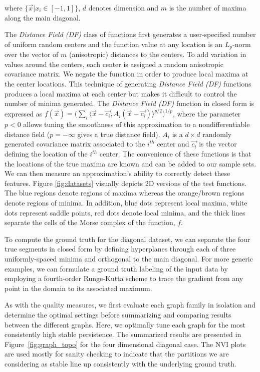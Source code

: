 where $\{\vec{x}|x_i\in [-1,1]\}$, $d$ denotes dimension and $m$ is the number of maxima along the main diagonal.

The \emph{Distance Field (DF)} class of functions first generates a user-specified number of uniform random centers and the function value at any location is an $L_p$-norm over the vector of $m$ (anisotropic) distances to the centers.
%
To add variation in values around the centers, each center is assigned a random anisotropic covariance matrix.
%
We negate the function in order to produce local maxima at the center locations.
%
This technique of generating \emph{Distance Field (DF)} functions produces a local maxima at each center but makes it difficult to control the number of minima generated.
%
The \emph{Distance Field (DF)} function in closed form is expressed as $f(\vec{x}) = \bigl(\sum_i \langle\vec{x}-\vec{c_i},A_i(\vec{x}-\vec{c_i})\rangle^{p/2}\bigr)^{1/p}$, where the parameter $p < 0$ allows tuning the smoothness of this approximation to a nondifferentiable distance field ($p = -\infty$ gives a true distance field).
%
$A_i$ is a $d \times d$ randomly generated covariance matrix associated to the $i^{th}$ center and $\vec{c_i}$ is the vector defining the location of the $i^{th}$ center.
%
The convenience of these functions is that the locations of the true maxima are known and can be added to our sample sets.
%
We can then measure an approximation's ability to correctly detect these features.
%
Figure \ref{fig:datasets} visually depicts 2D versions of the test functions.
%
The blue regions denote regions of maxima whereas the orange/brown regions denote regions of minima.
In addition, blue dots represent local maxima, white dots represent saddle points, red dots denote local minima, and the thick lines separate the cells
of the Morse complex of the function, $f$.

To compute the ground truth for the diagonal dataset, we can separate the four true segments in closed form by defining hyperplanes through each of three uniformly-spaced minima and orthogonal to the main diagonal.
%
For more generic examples, we can formulate a ground truth labeling of the input data by employing a fourth-order Runge-Kutta scheme to trace the gradient from any point in the domain to its associated maximum.

As with the quality measures, we first evaluate each graph family in isolation and determine the optimal settings before summarizing and comparing results between the different graphs.
%
Here, we optimally tune each graph for the most consistently high stable
persistence.
%
The summarized results are presented in Figure~\ref{fig:graph_topo} for the four dimensional diagonal case.
%
The NVI plots are used mostly for sanity checking to indicate that the partitions we are considering as stable line up consistently with the underlying ground truth.

